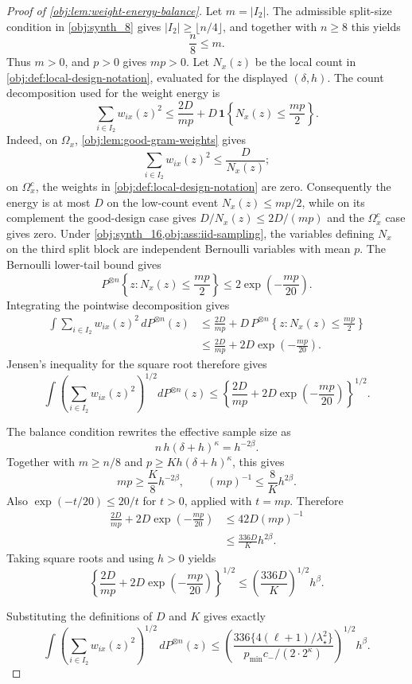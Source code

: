 \documentclass[11pt]{article}
\begin{document}
\begin{proof}[Proof of \cref{obj:lem:weight-energy-balance}]
Let \(m=|I_2|\).  The admissible split-size condition in \cref{obj:synth_8}
gives \(|I_2|\ge\lfloor n/4\rfloor\), and together with \(n\ge8\) this yields
\[
        \frac n8\le m .
\]
Thus \(m>0\), and \(p>0\) gives \(mp>0\).  Let \(N_x(z)\)
be the local count in \cref{obj:def:local-design-notation}, evaluated for the
displayed \((\delta,h)\).  The count decomposition used for the weight energy is
\[
 \sum_{i\in I_2}w_{ix}(z)^2
 \le
 \frac{2D}{mp}
 +D\,\mathbf 1\!\left\{N_x(z)\le\frac{mp}{2}\right\}.
\]
Indeed, on \(\Omega_x\), \cref{obj:lem:good-gram-weights} gives
\[
        \sum_{i\in I_2}w_{ix}(z)^2\le \frac{D}{N_x(z)};
\]
on \(\Omega_x^c\), the weights in \cref{obj:def:local-design-notation} are zero.
Consequently the energy is at most \(D\) on the low-count event
\(N_x(z)\le mp/2\), while on its complement the good-design case gives
\(D/N_x(z)\le2D/(mp)\) and the \(\Omega_x^c\) case gives zero.
Under \cref{obj:synth_16,obj:ass:iid-sampling}, the variables defining
\(N_x\) on the third split block are independent Bernoulli variables with mean
\(p\).  The Bernoulli lower-tail bound gives
\[
 P^{\otimes n}\!\left\{z:N_x(z)\le\frac{mp}{2}\right\}
 \le
 2\exp\!\left(-\frac{mp}{20}\right).
\]
Integrating the pointwise decomposition gives
\[
\begin{aligned}
 \int\sum_{i\in I_2}w_{ix}(z)^2\,dP^{\otimes n}(z)
 &\le
 \frac{2D}{mp}
 +D\,P^{\otimes n}\!\left\{z:N_x(z)\le\frac{mp}{2}\right\} \\
 &\le
 \frac{2D}{mp}
 +2D\exp\!\left(-\frac{mp}{20}\right).
\end{aligned}
\]
Jensen's inequality for the square root therefore gives
\[
 \int\left(\sum_{i\in I_2}w_{ix}(z)^2\right)^{1/2}dP^{\otimes n}(z)
 \le
 \left\{
 \frac{2D}{mp}
 +2D\exp\!\left(-\frac{mp}{20}\right)
 \right\}^{1/2}.
\]

The balance condition rewrites the effective sample size as
\[
        n\,h(\delta+h)^\kappa=h^{-2\beta}.
\]
Together with \(m\ge n/8\) and \(p\ge K h(\delta+h)^\kappa\), this gives
\[
        mp\ge \frac K8 h^{-2\beta},
        \qquad
        (mp)^{-1}\le \frac8K h^{2\beta}.
\]
Also \(\exp(-t/20)\le20/t\) for \(t>0\), applied with \(t=mp\).  Therefore
\[
\begin{aligned}
 \frac{2D}{mp}+2D\exp\!\left(-\frac{mp}{20}\right)
 &\le
 42D(mp)^{-1}  \\
 &\le
 \frac{336D}{K}h^{2\beta}.
\end{aligned}
\]
Taking square roots and using \(h>0\) yields
\[
 \left\{
 \frac{2D}{mp}
 +2D\exp\!\left(-\frac{mp}{20}\right)
 \right\}^{1/2}
 \le
 \left(\frac{336D}{K}\right)^{1/2}h^\beta .
\]

Substituting the definitions of \(D\) and \(K\) gives exactly
\[
\int
\left(\sum_{i\in I_2} w_{ix}(z)^2\right)^{1/2}
\,dP^{\otimes n}(z)
\le
\left(
\frac{336\{4(\ell+1)/\lambda_\star^2\}}
{p_{\min}c_-/(2\cdot 2^\kappa)}
\right)^{1/2}
h^\beta .
\]
\end{proof}
\end{document}
